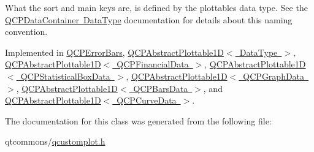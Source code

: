 What the sort and main keys are, is defined by the plottable\textquotesingle{}s data type. See the \mbox{\hyperlink{class_q_c_p_data_container_qcpdatacontainer-datatype}{Q\+C\+P\+Data\+Container Data\+Type}} documentation for details about this naming convention. 

Implemented in \mbox{\hyperlink{class_q_c_p_error_bars_af75958b95d9b9c7edfd9851c1d123850}{Q\+C\+P\+Error\+Bars}}, \mbox{\hyperlink{class_q_c_p_abstract_plottable1_d_afe0d56e39cc076032922f059b304c092}{Q\+C\+P\+Abstract\+Plottable1\+D$<$ Data\+Type $>$}}, \mbox{\hyperlink{class_q_c_p_abstract_plottable1_d_afe0d56e39cc076032922f059b304c092}{Q\+C\+P\+Abstract\+Plottable1\+D$<$ Q\+C\+P\+Financial\+Data $>$}}, \mbox{\hyperlink{class_q_c_p_abstract_plottable1_d_afe0d56e39cc076032922f059b304c092}{Q\+C\+P\+Abstract\+Plottable1\+D$<$ Q\+C\+P\+Statistical\+Box\+Data $>$}}, \mbox{\hyperlink{class_q_c_p_abstract_plottable1_d_afe0d56e39cc076032922f059b304c092}{Q\+C\+P\+Abstract\+Plottable1\+D$<$ Q\+C\+P\+Graph\+Data $>$}}, \mbox{\hyperlink{class_q_c_p_abstract_plottable1_d_afe0d56e39cc076032922f059b304c092}{Q\+C\+P\+Abstract\+Plottable1\+D$<$ Q\+C\+P\+Bars\+Data $>$}}, and \mbox{\hyperlink{class_q_c_p_abstract_plottable1_d_afe0d56e39cc076032922f059b304c092}{Q\+C\+P\+Abstract\+Plottable1\+D$<$ Q\+C\+P\+Curve\+Data $>$}}.



The documentation for this class was generated from the following file\+:\begin{DoxyCompactItemize}
\item 
qtcommons/\mbox{\hyperlink{qcustomplot_8h}{qcustomplot.\+h}}\end{DoxyCompactItemize}
